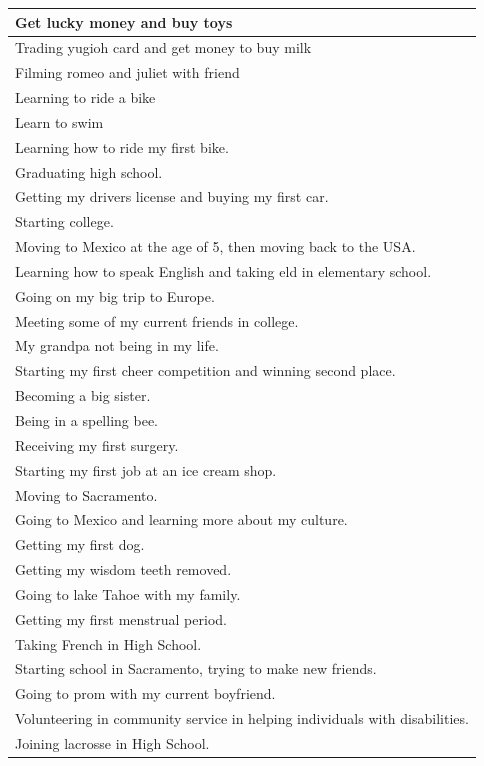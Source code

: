 \documentclass[
  .7em,
  letterpaper,
  DIV=11,
  numbers=noendperiod]{scrartcl}
\begin{document}
\begin{table}
\begin{tabular}{l}
Get lucky money and buy toys\\
\hline
Trading yugioh card and get money to buy milk\\
\hline
Filming romeo and juliet with friend\\
\hline
Learning to ride a bike\\
\hline
Learn to swim\\
\hline
Learning how to ride my first bike.\\
\hline
Graduating high school.\\
\hline
Getting my drivers license and buying my first car.\\
\hline
Starting college.\\
\hline
Moving to Mexico at the age of 5, then moving back to the USA.\\
\hline
Learning how to speak English and taking eld in elementary school.\\
\hline
Going on my big trip to Europe.\\
\hline
Meeting some of my current friends in college.\\
\hline
My grandpa not being in my life.\\
\hline
Starting my first cheer competition and winning second place.\\
\hline
Becoming a big sister.\\
\hline
Being in a spelling bee.\\
\hline
Receiving my first surgery.\\
\hline
Starting my first job at an ice cream shop.\\
\hline
Moving to Sacramento.\\
\hline
Going to Mexico and learning more about my culture.\\
\hline
Getting my first dog.\\
\hline
Getting my wisdom teeth removed.\\
\hline
Going to lake Tahoe with my family.\\
\hline
Getting my first menstrual period.\\
\hline
Taking French in High School.\\
\hline
Starting school in Sacramento, trying to make new friends.\\
\hline
Going to prom with my current boyfriend.\\
\hline
Volunteering in community service in helping individuals with disabilities.\\
\hline
Joining lacrosse in High School.\\

\end{tabular}
\end{table}
\end{document}
